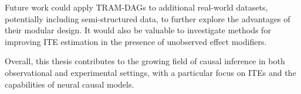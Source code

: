 Future work could apply TRAM-DAGs to additional real-world datasets, potentially including semi-structured data, to further explore the advantages of their modular design. It would also be valuable to investigate methods for improving ITE estimation in the presence of unobserved effect modifiers.

Overall, this thesis contributes to the growing field of causal inference in both observational and experimental settings, with a particular focus on ITEs and the capabilities of neural causal models.

% 
% 
% 
% 
% 
% 

